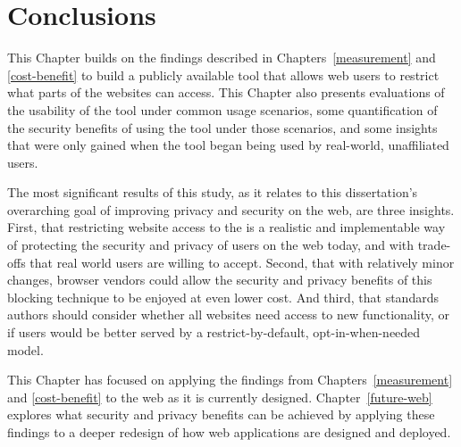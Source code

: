 \section{Conclusions}
\label{current-web:conclusions}

This Chapter builds on the findings described in Chapters~\ref{measurement} and
\ref{cost-benefit} to build a publicly available tool that allows web users to
restrict what parts of the \WAPI websites can access.  This Chapter also
presents evaluations of the usability of the tool under common usage scenarios,
some quantification of the security benefits of using the tool under those
scenarios, and some insights that were only gained when the tool began being
used by real-world, unaffiliated users.

The most significant results of this study, as it relates to this
dissertation's overarching goal of improving privacy and security on the web,
are three insights.  First, that restricting website access to the \WAPI is
a realistic and implementable way of protecting the security and privacy of
users on the web today, and with trade-offs that real world users are willing
to accept.  Second, that with relatively minor changes, browser vendors
could allow the security and privacy benefits of this \WAPI blocking technique
to be enjoyed at even lower cost.  And third, that standards authors should
consider whether all websites need access to new \WAPI functionality, or if
users would be better served by a restrict-by-default, opt-in-when-needed model.

This Chapter has focused on applying the findings from
Chapters~\ref{measurement} and \ref{cost-benefit} to the web as it is currently
designed.  Chapter~\ref{future-web} explores what security and privacy
benefits can be achieved by applying these findings to a deeper redesign of
how web applications are designed and deployed.
